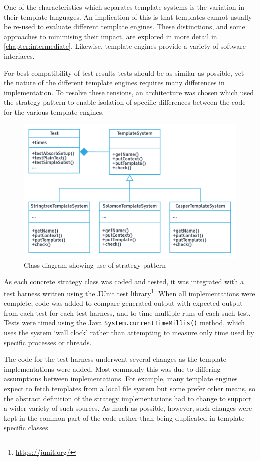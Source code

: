 One of the characteristics which separates template systems is the variation in their template languages. An implication of this is that templates cannot usually be re-used to evaluate different template engines. These distinctions, and some approaches to minimising their impact, are explored in more detail in \autoref{chapter:intermediate}. Likewise, template engines provide a variety of software interfaces.

For best compatibility of test results tests should be as similar as possible, yet the nature of the different template engines requires many differences in implementation. To resolve these tensions, an architecture was chosen which used the strategy pattern \citep{Gamma1994} to enable isolation of specific differences between the code for the various template engines.

\begin{figure}[ht!]
\centering
\includegraphics[width=130mm]{Figures/classes.png}
\caption{Class diagram showing use of strategy pattern}
\label{fs:figure:strategy}
\end{figure}

As each concrete strategy class was coded and tested, it was integrated with a test harness written using the JUnit test library\footnote{\url{https://junit.org/}}. When all implementations were complete, code was added to compare generated output with expected output from each test for each test harness, and to time multiple runs of each such test. Tests were timed using the Java \texttt{System.currentTimeMillis()} method, which uses the system `wall clock' rather than attempting to measure only time used by specific processes or threads.

The code for the test harness underwent several changes as the template implementations were added. Most commonly this was due to differing assumptions between implementations. For example, many template engines expect to fetch templates from a local file system but some prefer other means, so the abstract definition of the strategy implementations had to change to support a wider variety of such sources. As much as possible, however, such changes were kept in the common part of the code rather than being duplicated in template-specific classes.

